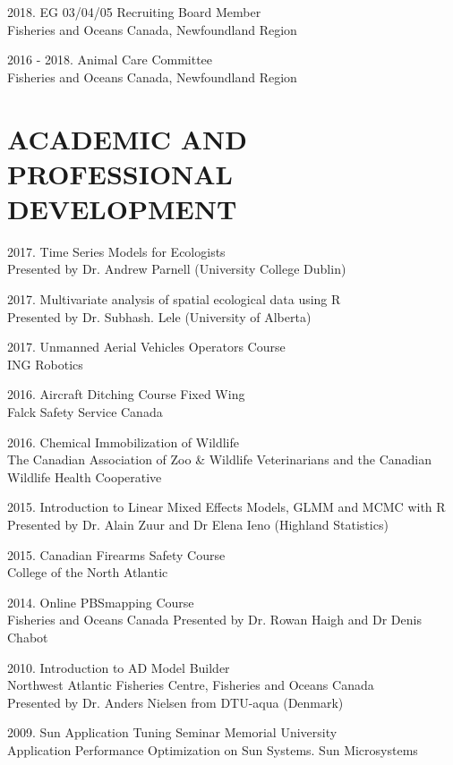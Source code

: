 \documentclass{res}
\begin{document}
\begin{resume}
\begin{hangparas}{.4in}{1}
2018. EG 03/04/05 Recruiting Board Member\\
Fisheries and Oceans Canada, Newfoundland Region

2016 - 2018. Animal Care Committee\\
Fisheries and Oceans Canada, Newfoundland Region


\end{hangparas}
\section{ACADEMIC AND PROFESSIONAL DEVELOPMENT}
\vspace{0.2in}
\begin{hangparas}{.4in}{1}
2017. Time Series Models for Ecologists\\ 
Presented by Dr. Andrew Parnell (University College Dublin)

2017. Multivariate analysis of spatial ecological data using R\\
Presented by Dr. Subhash. Lele (University of Alberta)

2017. Unmanned Aerial Vehicles Operators Course\\ 
ING Robotics

2016. Aircraft Ditching Course Fixed Wing \\
Falck Safety Service Canada

2016. Chemical Immobilization of Wildlife\\
The Canadian Association of Zoo \& Wildlife Veterinarians and the Canadian Wildlife Health Cooperative

2015. Introduction to Linear Mixed Effects Models, GLMM and MCMC with R\\
Presented by Dr. Alain Zuur and Dr Elena Ieno (Highland Statistics)

2015. Canadian Firearms Safety Course\\
College of the North Atlantic

2014. Online PBSmapping  Course\\
Fisheries and Oceans Canada 
Presented by Dr. Rowan Haigh and Dr Denis Chabot

2010. Introduction to AD Model Builder\\
Northwest Atlantic Fisheries Centre, Fisheries and Oceans Canada \\
Presented by Dr. Anders Nielsen from DTU-aqua (Denmark)

2009. Sun Application Tuning Seminar
Memorial University\\
Application Performance Optimization on Sun Systems. Sun Microsystems


\end{hangparas}
\end{resume}
\end{document}
